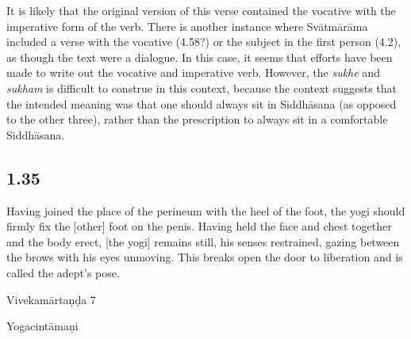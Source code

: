 \begin{ekdosis}
\begin{philcomm}[hp01_034]
It is likely that the original version of this verse contained the vocative with the imperative form of the verb. There is another instance where Svātmārāma included a verse with the vocative (4.58?) or the subject in the first person (4.2), as though the text were a dialogue. In this case, it seems that efforts have been made to write out the vocative and imperative verb. However, the \emph{sukhe} and \emph{sukham} is difficult to construe in this context, because the context suggests that the intended meaning was that one should always sit in Siddhāsana (as opposed to the other three), rather than the prescription to always sit in a comfortable Siddhāsana.   
\end{philcomm}

\subsection*{1.35}
\begin{translation}[hp01_035]
Having joined the place of the perineum with the heel of the foot, the yogi should firmly fix the [other] foot on the penis. Having held the face and chest together and the body erect, [the yogi] remains still, his senses restrained, gazing between the brows with his eyes unmoving. This breaks open the door to liberation and is called the adept’s pose.
\end{translation}

\begin{sources}[hp01_035]
Vivekamārtaṇḍa 7

\begin{versinnote}
\end{versinnote}

\end{sources}

\begin{testimonia}[hp01_035]
Yogacintāmaṇi

\begin{versinnote}
\end{versinnote}


\end{testimonia}
\end{ekdosis}

